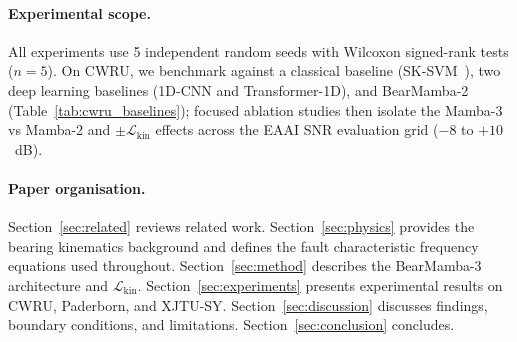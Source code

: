 \paragraph{Experimental scope.}
All experiments use 5 independent random seeds with Wilcoxon signed-rank
tests ($n=5$).
On CWRU, we benchmark against a classical baseline
(SK-SVM~\cite{antoni2006spectral_kurtosis}), two deep learning baselines
(1D-CNN and Transformer-1D), and BearMamba-2 (Table~\ref{tab:cwru_baselines});
focused ablation studies then isolate the Mamba-3 vs Mamba-2 and
$\pm\mathcal{L}_{\text{kin}}$ effects across the EAAI SNR evaluation grid
($-8$ to $+10$~dB).

\paragraph{Paper organisation.}
Section~\ref{sec:related} reviews related work.
Section~\ref{sec:physics} provides the bearing kinematics background and
defines the fault characteristic frequency equations used throughout.
Section~\ref{sec:method} describes the BearMamba-3 architecture and
$\mathcal{L}_{\text{kin}}$.
Section~\ref{sec:experiments} presents experimental results on CWRU,
Paderborn, and XJTU-SY.
Section~\ref{sec:discussion} discusses findings, boundary conditions, and
limitations.
Section~\ref{sec:conclusion} concludes.
